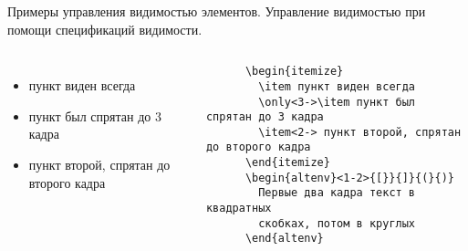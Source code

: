 \documentclass{beamer}
\begin{document}
\begin{frame}{
    Примеры управления видимостью элементов.
  }{
    Управление видимостью при помощи спецификаций видимости.
  }
  \begin{columns}
      \begin{itemize}
        \item пункт виден всегда
        \item пункт был спрятан до 3 кадра
        \item<2-> пункт второй, спрятан до второго кадра
      \end{itemize}
      \begin{altenv}<1-2>{[}}{]}{(}{)}
        Первые два кадра текст в квадратных скобках, потом в круглых
      \end{altenv}
      \onslide
      \begin{verbatim}
      \begin{itemize}
        \item пункт виден всегда
        \only<3->\item пункт был спрятан до 3 кадра
        \item<2-> пункт второй, спрятан до второго кадра
      \end{itemize}
      \begin{altenv}<1-2>{[}}{]}{(}{)}
        Первые два кадра текст в квадратных 
        скобках, потом в круглых
      \end{altenv}
      \end{verbatim}
  \end{columns}
\end{frame}
\end{document}
